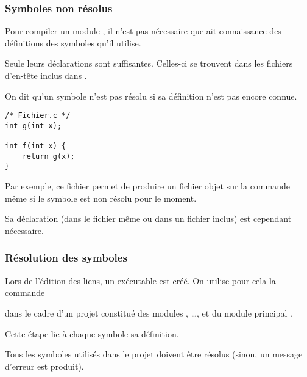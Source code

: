 \begin{frame}[fragile]
\frametitle{Symboles non résolus}
Pour compiler un module , il n'est pas nécessaire que 
ait connaissance des définitions des symboles qu'il utilise.
\medskip

Seule leurs déclarations sont suffisantes. Celles-ci se trouvent
dans les fichiers d'en-tête inclus dans .
\bigskip

On dit qu'un symbole n'est pas \alert{résolu} si sa définition n'est pas
encore connue.
\bigskip

\begin{minipage}[c]{.3\textwidth}
\begin{lstlisting}[frame=single,numbers=none]
/* Fichier.c */
int g(int x);

int f(int x) {
    return g(x);
}
\end{lstlisting}
\end{minipage}\qquad
\begin{minipage}[c]{.6\textwidth}
Par exemple, ce fichier permet de produire un fichier objet sur la commande
 même si le symbole  est non résolu pour
le moment.
\smallskip

Sa déclaration (dans le fichier même ou dans un fichier inclus) est
cependant nécessaire.
\end{minipage}
\end{frame}

\begin{frame}[fragile]
\frametitle{Résolution des symboles}
Lors de l'édition des liens, un exécutable est créé. On utilise pour
cela la commande
\begin{center}  \end{center}
dans le cadre d'un projet constitué des modules , \dots, 
et du module principal .
\bigskip

Cette étape \alert{lie à chaque symbole sa définition}.
\medskip

Tous les symboles utilisés dans le projet doivent être résolus (sinon,
un message d'erreur est produit).
\end{frame}

